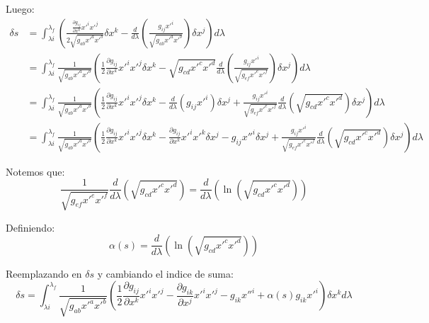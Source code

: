 \documentclass[12pt]{report}
\begin{document}
Luego:
	\begin{align*}
		\delta s &= \int^{\lambda_{f}}_{\lambda{i}} \left( \frac{\frac{\partial g_{ij}}{\partial x^{k}}x'^{i}x'^{j}}{2\sqrt{g_{ab}x'^{a}x'^{b}}} \delta x^{k}
				                                        -  \frac{d}{d\lambda} \left( \frac{g_{ij}x'^{i}}{\sqrt{g_{ab}x'^{a}x'^{b}}} \right) \delta x^{j} \right) d\lambda \\ 
				 &= \int^{\lambda_{f}}_{\lambda{i}} \frac{1}{\sqrt{g_{ab}x'^{a}x'^{b}}} \left( \frac{1}{2}\frac{\partial g_{ij}}{\partial x^{k}} x'^{i}x'^{j} \delta x^{k}
				                                        -  \sqrt{g_{cd}x'^{c}x'^{d}}\frac{d}{d\lambda} \left( \frac{g_{ij}x'^{i}}{\sqrt{g_{ef}x'^{e}x'^{f}}} \right) \delta x^{j} \right) d\lambda \\ 
				 &= \int^{\lambda_{f}}_{\lambda{i}} \frac{1}{\sqrt{g_{ab}x'^{a}x'^{b}}} \left( \frac{1}{2}\frac{\partial g_{ij}}{\partial x^{k}} x'^{i}x'^{j} \delta x^{k}
				                                        - \frac{d}{d\lambda} \left( g_{ij}x'^{i} \right) \delta x^{j}  
				                                        + \frac{g_{ij}x'^{i}}{\sqrt{g_{ef}x'^{e}x'^{f}}} \frac{d}{d\lambda} \left( \sqrt{g_{cd}x'^{c}x'^{d}} \right) \delta x^{j} 
														\right) d\lambda\\
				&= 	\int^{\lambda_{f}}_{\lambda{i}} \frac{1}{\sqrt{g_{ab}x'^{a}x'^{b}}} \left( \frac{1}{2}\frac{\partial g_{ij}}{\partial x^{k}} x'^{i}x'^{j} \delta x^{k}
				                                        - \frac{\partial g_{ij}}{\partial x^{k}} x'^{i} x'^{k}\delta x^{j} - g_{ij}x''^{i}\delta x^{j}  
				                                        + \frac{g_{ij}x'^{i}}{\sqrt{g_{ef}x'^{e}x'^{f}}} \frac{d}{d\lambda} \left( \sqrt{g_{cd}x'^{c}x'^{d}} \right) \delta x^{j} 
														\right) d\lambda										
	\end{align*}
	
Notemos que:
	\begin{equation*}
		\frac{1}{\sqrt{g_{ef}x'^{e}x'^{f}}} \frac{d}{d\lambda} \left( \sqrt{g_{cd}x'^{c}x'^{d}} \right)
		=  \frac{d}{d\lambda} \left( \ln \left( \sqrt{g_{cd}x'^{c}x'^{d}} \right) \right)
	\end{equation*}

Definiendo:
	\begin{equation*}
		\alpha(s) = \frac{d}{d\lambda} \left( \ln \left( \sqrt{g_{cd}x'^{c}x'^{d}} \right) \right)
	\end{equation*}
	
Reemplazando en $\delta s$ y cambiando el indice de suma:
	\begin{equation*}
		\delta s =  \int^{\lambda_{f}}_{\lambda{i}} \frac{1}{\sqrt{g_{ab}x'^{a}x'^{b}}} \left( \frac{1}{2}\frac{\partial g_{ij}}{\partial x^{k}} x'^{i}x'^{j} 
			                                       - \frac{\partial g_{ik}}{\partial x^{j}} x'^{i} x'^{j} - g_{ik}x''^{i} 
				                                        + \alpha\left( s \right) g_{ik}x'^{i} 
														\right) \delta x^{k}  d\lambda	
	\end{equation*}
	
\end{document}
